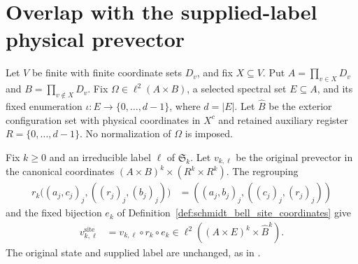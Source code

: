 \section{Overlap with the supplied-label physical prevector}

Let $V$ be finite with finite coordinate sets $D_v$, and fix $X\subseteq V$.
Put $A=\prod_{v\in X}D_v$ and $B=\prod_{v\notin X}D_v$.
Fix $\Omega\in\ell^2(A\times B)$, a selected spectral set $E\subseteq A$,
and its fixed enumeration $\iota:E\to\{0,\ldots,d-1\}$, where $d=|E|$.
Let $\widehat B$ be the exterior configuration set with physical coordinates
in $X^c$ and retained auxiliary register $R=\{0,\ldots,d-1\}$.
No normalization of $\Omega$ is imposed.

\begin{definition}
    \label{def:schmidt_bell_site_prevector}
    \leanok
    Fix $k\geq0$ and an irreducible label $\ell$ of $\mathfrak S_k$.
    Let $v_{k,\ell}$ be the original prevector in the canonical coordinates
    $(A\times B)^k\times(R^k\times R^k)$.
    The regrouping
    \begin{align*}
        r_k\bigl((a_j,c_j)_j,((r_j)_j,(b_j)_j)\bigr)
        &=((a_j,b_j)_j,((c_j)_j,(r_j)_j))
    \end{align*}
    and the fixed bijection $e_k$ of
    Definition~\ref{def:schmidt_bell_site_coordinates} give
    \begin{align*}
        v^{\mathrm{site}}_{k,\ell}&=v_{k,\ell}\circ r_k\circ e_k
        \in\ell^2((A\times E)^k\times\widehat B^k).
    \end{align*}
    The original state and supplied label are unchanged, as in
    \cite[Section~8, lines~240--254 and~283--290]{OpenAI2026AreaLaw}.
\end{definition}

